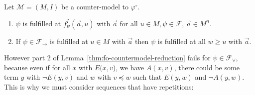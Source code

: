 \documentclass[runningheads]{llncs}
\begin{document}
\begin{lemma}
\label{thm:fo-countermodel-reduction}
	Let $\mathcal M = (M, I)$ be a counter-model to $\mathcal \varphi^\circ$.
	\begin{enumerate}
		\item $\psi$ is fulfilled at $f_\psi^I(\vec a, u)$ with $\vec a$ for all $u\in M, \psi\in\mathcal F$, $\vec a\in M^n$.
		\item If $\psi\in\mathcal F_\to$ is fulfilled at $u\in M$ with $\vec a$ then $\psi$ is fulfilled at all $w\geq u$ with $\vec a$.
	\end{enumerate}	
\end{lemma}

However part 2 of Lemma~\ref{thm:fo-countermodel-reduction} fails for $\psi\in\mathcal F_\forall$, because even if for all $x$ with $E(x, v$), we have $A(x, v)$, there could be some term $y$ with $\neg E(y, v)$ and $w$ with $v\preceq w$ such that $E(y, w)$ and $\neg A(y, w)$. This is why we must consider sequences that have repetitions:
\end{document}
